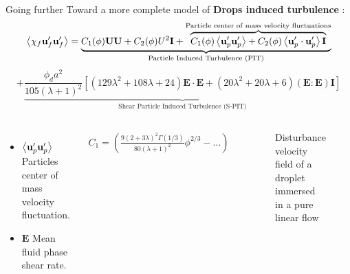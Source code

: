 \documentclass{sintefbeamer}
\begin{document}
\begin{frame}
  {Going further}
  Toward a more complete model of \textbf{Drops induced turbulence} : 
  \small
  \begin{equation*}
    \left<\chi_f  \textbf{u}_f' \textbf{u}_f'\right>
    =
    \underbrace{
      C_1(\phi)\textbf{UU}
    + C_2(\phi)U^2 \textbf{I}
    + \overbrace{C_1(\phi)\left<\textbf{u}_p'\textbf{u}_p'\right>
    + C_2(\phi)\left<\textbf{u}_{p}'\cdot \textbf{u}_{p}'\right>\textbf{I}
    }^{\text{Particle center of mass velocity fluctuations}}
    }_\text{Particle Induced Turbulence (PIT)}
  \end{equation*}
  \pause
  \begin{equation*}
    + \underbrace{\frac{\phi_d a^2 }{105 (\lambda +1)^2 }\left[
        (129\lambda^2+108\lambda+24)\textbf{E}\cdot \textbf{E}
        + (20\lambda^2 +20\lambda + 6)
        (\textbf{E} : \textbf{E})\textbf{I}
    \right]}_\text{Shear Particle Induced Turbulence (S-PIT)}
\end{equation*}
\begin{columns}
  \begin{itemize}
    \item $\left<\textbf{u}_p'\textbf{u}_p'\right>$ Particles center of mass velocity fluctuation.  
    \item $\textbf{E}$ Mean fluid phase shear rate. 
  \end{itemize}
  \begin{align*}
    C_{1} = \left(\frac{9(2+3\lambda)^2 \Gamma(1/3)}{80 (\lambda +1)^2}\phi^{2/3} 
    - \ldots\right)\\
  \end{align*}
  \begin{figure}
    \caption{Disturbance velocity field of a droplet immersed in a pure linear flow}
  \end{figure}
  \includegraphics[width=0.6\textwidth]{image/Shear_Stokes.png}
\end{columns}
\end{frame}
\end{document}
